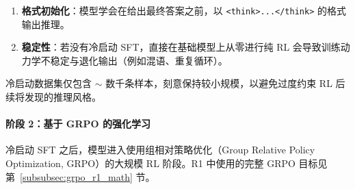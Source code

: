 \begin{enumerate}
  \item \textbf{格式初始化}：模型学会在给出最终答案之前，以 \texttt{<think>...</think>} 的格式输出推理。
  \item \textbf{稳定性}：若没有冷启动 SFT，直接在基础模型上从零进行纯 RL 会导致训练动力学不稳定与退化输出（例如混语、重复循环）。
\end{enumerate}

冷启动数据集仅包含 $\sim$ 数千条样本，刻意保持较小规模，以避免过度约束 RL 后续将发现的推理风格。

\paragraph{阶段 2：基于 GRPO 的强化学习}
\label{stage-2-grpo-based-reinforcement-learning}

冷启动 SFT 之后，模型进入使用组相对策略优化（Group Relative Policy Optimization, GRPO）的大规模 RL 阶段。R1 中使用的完整 GRPO 目标见第~\ref{subsubsec:grpo_r1_math} 节。

